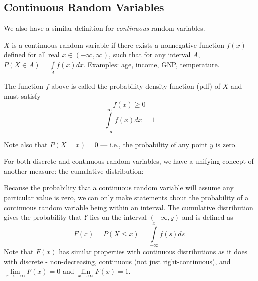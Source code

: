 \documentclass[
]{book}
\begin{document}
\hypertarget{continuous-random-variables}{%
\subsection*{Continuous Random Variables}\label{continuous-random-variables}}

We also have a similar definition for \emph{continuous} random variables.

\begin{definition}
\protect\hypertarget{def:unnamed-chunk-78}{}\label{def:unnamed-chunk-78}\(X\) is a continuous random variable if there exists a nonnegative function \(f(x)\) defined for all real \(x\in (-\infty,\infty)\), such that for any interval \(A\), \(P(X\in A)=\int\limits_A f(x)dx\). Examples: age, income, GNP, temperature.
\end{definition}

\begin{definition}
\protect\hypertarget{def:unnamed-chunk-79}{}\label{def:unnamed-chunk-79}The function \(f\) above is called the probability density function (pdf) of \(X\) and must satisfy
\[f(x)\ge 0\]
\[\int\limits_{-\infty}^\infty f(x)dx=1\]

Note also that \(P(X = x)=0\) --- i.e., the probability of any point \(y\) is zero.
\end{definition}

For both discrete and continuous random variables, we have a unifying concept of another measure: the cumulative distribution:

\begin{definition}
\protect\hypertarget{def:unnamed-chunk-80}{}\label{def:unnamed-chunk-80}Because the probability that a continuous random variable will assume any particular value is zero, we can only make statements about the probability of a continuous random variable being within an interval. The cumulative distribution gives the probability that \(Y\) lies on the interval \((-\infty,y)\) and is defined as \[F(x)=P(X\le x)=\int\limits_{-\infty}^x f(s)ds\] Note that \(F(x)\) has similar properties with continuous distributions as it does with discrete - non-decreasing, continuous (not just right-continuous), and \(\lim\limits_{x \to -\infty} F(x) = 0\) and \(\lim\limits_{x \to \infty} F(x) = 1\).
\end{definition}
\end{document}
